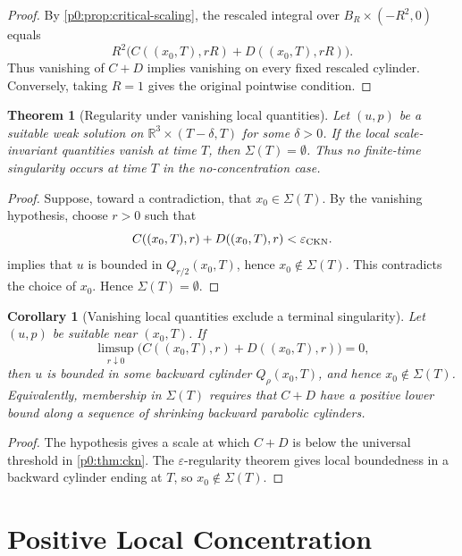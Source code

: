 \documentclass[11pt]{amsart}
\theoremstyle{plain}
\newtheorem{theorem}{Theorem}[section]
\newtheorem{corollary}[corollary]{Corollary}
\theoremstyle{definition}
\theoremstyle{remark}
\numberwithin{equation}{section}
\begin{document}
\begin{proof}
By \cref{p0:prop:critical-scaling}, the rescaled integral over
\(B_R\times(-R^2,0)\) equals
\[
  R^2\bigl(C((x_0,T),rR)+D((x_0,T),rR)\bigr).
\]
Thus vanishing of \(C+D\) implies vanishing on every fixed rescaled cylinder.
Conversely, taking \(R=1\) gives the original pointwise condition.
\end{proof}

\begin{theorem}[Regularity under vanishing local quantities]\label{p0:thm:no-concentration}
Let \((u,p)\) be a suitable weak solution on
\(\mathbb R^3\times(T-\delta,T)\) for some \(\delta>0\).  If the local
scale-invariant quantities vanish at time \(T\), then
\(\Sigma(T)=\emptyset\).  Thus no finite-time singularity occurs at time \(T\)
in the no-concentration case.
\end{theorem}

\begin{proof}
Suppose, toward a contradiction, that \(x_0\in\Sigma(T)\).  By the vanishing
hypothesis, choose \(r>0\) such that
\[
  C((x_0,T),r)+D((x_0,T),r)<\varepsilon_{\rm CKN}.
\]
 implies that \(u\) is bounded in \(Q_{r/2}(x_0,T)\), hence
\(x_0\notin\Sigma(T)\).  This contradicts the choice of \(x_0\).  Hence
\(\Sigma(T)=\emptyset\).
\end{proof}

\begin{corollary}[Vanishing local quantities exclude a terminal singularity]
\label{p0:cor:escape}
Let \((u,p)\) be suitable near \((x_0,T)\).  If
\[
  \limsup_{r\downarrow0}
  \bigl(C((x_0,T),r)+D((x_0,T),r)\bigr)=0,
\]
then \(u\) is bounded in some backward cylinder \(Q_\rho(x_0,T)\), and hence
\(x_0\notin\Sigma(T)\).  Equivalently, membership in \(\Sigma(T)\) requires
that \(C+D\) have a positive lower bound along a sequence of shrinking backward
parabolic cylinders.
\end{corollary}

\begin{proof}
The hypothesis gives a scale at which \(C+D\) is below the universal threshold
in \cref{p0:thm:ckn}.  The \(\varepsilon\)-regularity theorem gives local boundedness in
a backward cylinder ending at \(T\), so \(x_0\notin\Sigma(T)\).
\end{proof}

\section{Positive Local Concentration}
\end{document}
